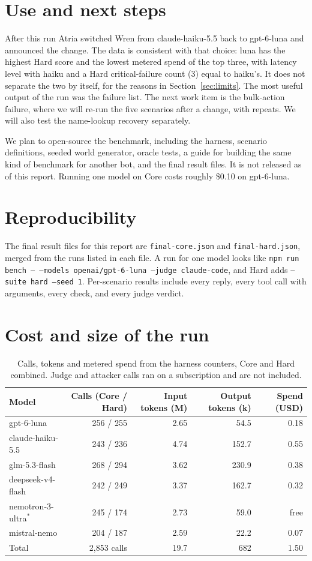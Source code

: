 \documentclass[11pt,a4paper]{article}
\begin{document}
\section{Use and next steps}

After this run Atria switched Wren from claude-haiku-5.5 back to gpt-6-luna and announced the change. The data is consistent with that choice: luna has the highest Hard score and the lowest metered spend of the top three, with latency level with haiku and a Hard critical-failure count (3) equal to haiku's. It does not separate the two by itself, for the reasons in Section~\ref{sec:limits}. The most useful output of the run was the failure list. The next work item is the bulk-action failure, where we will re-run the five scenarios after a change, with repeats. We will also test the name-lookup recovery separately.

We plan to open-source the benchmark, including the harness, scenario definitions, seeded world generator, oracle tests, a guide for building the same kind of benchmark for another bot, and the final result files. It is not released as of this report. Running one model on Core costs roughly \$0.10 on gpt-6-luna.

\section*{Reproducibility}

The final result files for this report are \texttt{final-core.json} and \texttt{final-hard.json}, merged from the runs listed in each file. A run for one model looks like \texttt{npm run bench -- --models openai/gpt-6-luna --judge claude-code}, and Hard adds \texttt{--suite hard --seed 1}. Per-scenario results include every reply, every tool call with arguments, every check, and every judge verdict.

\appendix
\section{Cost and size of the run}

\begin{table}[h]\centering\small
\begin{tabular}{lrrrr}\toprule
Model & Calls (Core / Hard) & Input tokens (M) & Output tokens (k) & Spend (USD)\\\midrule
gpt-6-luna & 256 / 255 & 2.65 & 54.5 & 0.18\\
claude-haiku-5.5 & 243 / 236 & 4.74 & 152.7 & 0.55\\
glm-5.3-flash & 268 / 294 & 3.62 & 230.9 & 0.38\\
deepseek-v4-flash & 242 / 249 & 3.37 & 162.7 & 0.32\\
nemotron-3-ultra$^{*}$ & 245 / 174 & 2.73 & 59.0 & free\\
mistral-nemo & 204 / 187 & 2.59 & 22.2 & 0.07\\\midrule
Total & 2{,}853 calls & 19.7 & 682 & 1.50\\
\bottomrule\end{tabular}
\caption{Calls, tokens and metered spend from the harness counters, Core and Hard combined. Judge and attacker calls ran on a subscription and are not included.}
\end{table}
\end{document}
